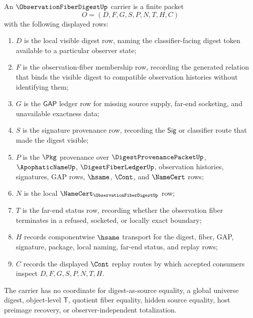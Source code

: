 \begin{definition}
\label{def:observation-fiber-digest-carrier}
An $\ObservationFiberDigestUp$ carrier is a finite packet
$$
O=(D,F,G,S,P,N,T,H,C)
$$
with the following displayed rows:
\begin{enumerate}
\item $D$ is the local visible digest row, naming the classifier-facing digest token available to a particular observer state;
\item $F$ is the observation-fiber membership row, recording the generated relation that binds the visible digest to compatible observation histories without identifying them;
\item $G$ is the $\mathsf{GAP}$ ledger row for missing source supply, far-end socketing, and unavailable exactness data;
\item $S$ is the signature provenance row, recording the $\mathsf{Sig}$ or classifier route that made the digest visible;
\item $P$ is the $\Pkg$ provenance over $\DigestProvenancePacketUp$, $\ApophaticNameUp$, $\DigestFiberLedgerUp$, observation histories, signatures, GAP rows, $\hsame$, $\Cont$, and $\NameCert$ rows;
\item $N$ is the local $\NameCert_{\ObservationFiberDigestUp}$ row;
\item $T$ is the far-end status row, recording whether the observation fiber terminates in a refused, socketed, or locally exact boundary;
\item $H$ records componentwise $\hsame$ transport for the digest, fiber, GAP, signature, package, local naming, far-end status, and replay rows;
\item $C$ records the displayed $\Cont$ replay routes by which accepted consumers inspect $D,F,G,S,P,N,T,H$.
\end{enumerate}
The carrier has no coordinate for digest-as-source equality, a global universe digest, object-level $\mathsf{T}$, quotient fiber equality, hidden source equality, host preimage recovery, or observer-independent totalization.
\end{definition}

